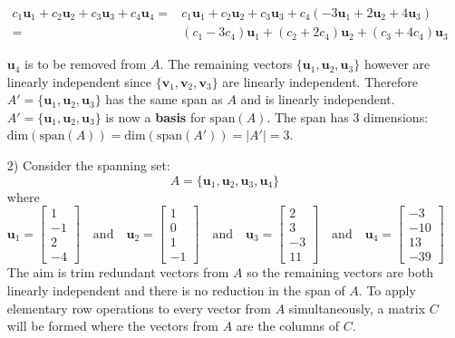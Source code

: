 \documentclass{article}
\begin{document}
\begin{itemize}
\begin{align*}   
c_1 \mathbf{u}_1 + c_2 \mathbf{u}_2 + c_3 \mathbf{u}_3 + c_4 \mathbf{u}_4 
= & c_1 \mathbf{u}_1 + c_2 \mathbf{u}_2 + c_3 \mathbf{u}_3 + c_4 (-3\mathbf{u}_1 + 2\mathbf{u}_2 + 4\mathbf{u}_3) \\
= & (c_1 - 3c_4)\mathbf{u}_1 + (c_2 + 2c_4)\mathbf{u}_2 + (c_3 + 4c_4)\mathbf{u}_3
\end{align*}   

\(\mathbf{u}_4\) is to be removed from \(A\). The remaining vectors \(\{\mathbf{u}_1, \mathbf{u}_2, \mathbf{u}_3\}\) however are linearly independent since \(\{\mathbf{v}_1, \mathbf{v}_2, \mathbf{v}_3\}\) are linearly independent. Therefore \(A' = \{\mathbf{u}_1, \mathbf{u}_2, \mathbf{u}_3\}\) has the same span as \(A\) and is linearly independent. \(A' = \{\mathbf{u}_1, \mathbf{u}_2, \mathbf{u}_3\}\) is now a {\bf basis} for \(\text{span}(A)\). The span has \(3\) dimensions: \(\text{dim}(\text{span}(A)) = \text{dim}(\text{span}(A')) = |A'| = 3\).
\item[2)] Consider the spanning set:
\[A = \{\mathbf{u}_1, \mathbf{u}_2, \mathbf{u}_3, \mathbf{u}_4\}\]
where
\[\mathbf{u}_1 = \begin{bmatrix}
1 \\ -1 \\ 2 \\ -4  
\end{bmatrix} \quad\text{and}\quad \mathbf{u}_2 =\begin{bmatrix} 
1 \\ 0 \\ 1 \\ -1
\end{bmatrix} \quad\text{and}\quad \mathbf{u}_3 = \begin{bmatrix} 
2 \\ 3 \\ -3 \\ 11
\end{bmatrix} \quad\text{and}\quad \mathbf{u}_4 = \begin{bmatrix}
-3 \\ -10 \\ 13 \\ -39
\end{bmatrix}\] 
The aim is trim redundant vectors from \(A\) so the remaining vectors are both linearly independent and there is no reduction in the span of \(A\). To apply elementary row operations to every vector from \(A\) simultaneously, a matrix \(C\) will be formed where the vectors from \(A\) are the columns of \(C\).

\end{itemize}
\end{document}
